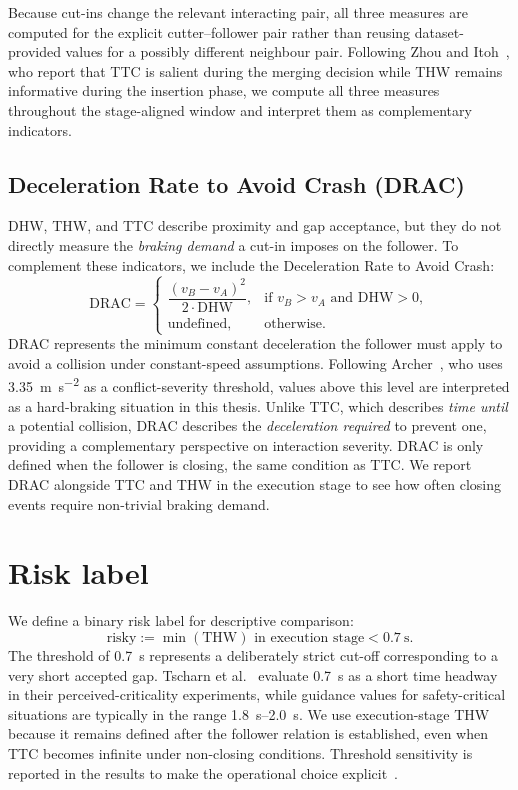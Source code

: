 \documentclass[12pt,a4paper,twoside,openright]{report}
\begin{document}
    Because cut-ins change the relevant interacting pair, all three measures are computed for the explicit cutter--follower pair rather than reusing dataset-provided values for a possibly different neighbour pair. Following Zhou and Itoh~\cite{zhou2016riskperception}, who report that TTC is salient during the merging decision while THW remains informative during the insertion phase, we compute all three measures throughout the stage-aligned window and interpret them as complementary indicators.

    \subsection{Deceleration Rate to Avoid Crash (DRAC)}
    \label{sec:drac-theory}
    DHW, THW, and TTC describe proximity and gap acceptance, but they do not directly measure the \emph{braking demand} a cut-in imposes on the follower. To complement these indicators, we include the Deceleration Rate to Avoid Crash:
    \[
        \mathrm{DRAC} =
        \begin{cases}
            \dfrac{(v_B - v_A)^2}{2 \cdot \mathrm{DHW}}, & \text{if } v_B > v_A \text{ and } \mathrm{DHW} > 0, \\[6pt]
            \text{undefined}, & \text{otherwise.}
        \end{cases}
    \]
    DRAC represents the minimum constant deceleration the follower must apply to avoid a collision under constant-speed assumptions. Following Archer~\cite{archer2005indicators}, who uses \SI{3.35}{\meter\per\second\squared} as a conflict-severity threshold, values above this level are interpreted as a hard-braking situation in this thesis. Unlike TTC, which describes \emph{time until} a potential collision, DRAC describes the \emph{deceleration required} to prevent one, providing a complementary perspective on interaction severity. DRAC is only defined when the follower is closing, the same condition as TTC. We report DRAC alongside TTC and THW in the execution stage to see how often closing events require non-trivial braking demand.

    \section{Risk label}
    We define a binary risk label for descriptive comparison:
    \[
        \text{risky} := \min(\mathrm{THW}) \text{ in execution stage} < \SI{0.7}{\second}.
    \]
    The threshold of \SI{0.7}{\second} represents a deliberately strict cut-off corresponding to a very short accepted gap. Tscharn et al.~\cite{tscharn2018thw} evaluate \SI{0.7}{\second} as a short time headway in their perceived-criticality experiments, while guidance values for safety-critical situations are typically in the range \SIrange{1.8}{2.0}{\second}. We use execution-stage THW because it remains defined after the follower relation is established, even when TTC becomes infinite under non-closing conditions. Threshold sensitivity is reported in the results to make the operational choice explicit~\cite{wang2021ssm}.
\end{document}
